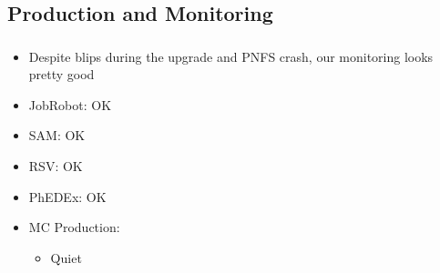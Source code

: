 \documentclass{beamer}
\begin{document}
\subsection{Production and Monitoring}
\begin{frame}
\frametitle{}
\begin{itemize}
	\item Despite blips during the upgrade and PNFS crash, our monitoring looks pretty good
	\item JobRobot: OK
	\item SAM: OK
	\item RSV: OK
	\item PhEDEx: OK
	\item MC Production:
	\begin{itemize}
		\item Quiet
	\end{itemize}
\end{itemize}
\end{frame}
\end{document}
